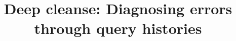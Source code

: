 



\newcommand{\red}[1]{\textcolor{red}{#1}}
\newcommand{\green}[1]{\textcolor{green}{#1}}
\newcommand{\blue}[1]{\textcolor{blue}{#1}}
\newcommand{\orange}[1]{\textcolor{orange}{#1}}
\newcommand{\darkred}[1]{\textcolor{darkred}{#1}}
\newcommand{\darkgreen}[1]{\textcolor{darkgreen}{#1}}
\newcommand{\darkblue}[1]{\textcolor{darkblue}{#1}}


\newcommand{\alex}[1]{\noindent{\color{darkgreen}{Alexandra: #1}}}
\newcommand{\xlw}[1]{\noindent{\color{blue}{Xiaolan: #1}}}
\newcommand{\ewu}[1]{\noindent{\color{red}{EWu: #1}}}
\newcommand{\xxx}[1]{{\fontsize{13pt}{13pt}\selectfont\textcolor{red}{#1}}}
\newcommand{\codesize}{\fontsize{7}{8}}
\newcommand{\stitle}[1]{\vspace{0.5em}\noindent\textbf{#1}}
\newcommand{\calF}[0]{$\cal{F}$}

\newcommand{\ind}{\hspace{\algorithmicindent}}
\newcommand{\sys}{\textsc{DeepCleanse}\xspace}
\newcommand{\gcost}{{\sc Greedy-Cost}\xspace}

\newcommand{\deprecate}[1]{}

\newcommand{\prob}{{\sc Data-Fracking}\xspace}
\newcommand{\exact}{{\sc EXACTSOL}\xspace}
\newcommand{\qfix}{{\sc SingleQueryFix}\xspace}
\newcommand{\density}{{\sc DENSITY}\xspace}






\title{Deep cleanse: Diagnosing errors through query histories}


